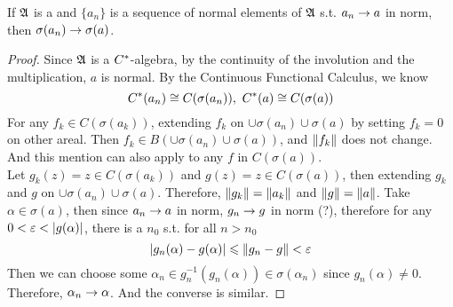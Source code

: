 \begin{lem}
	If $\mathfrak{A}$ is a \Cs and $\{a_n\}$ is a sequence of normal elements of $\mathfrak{A}$ s.t. $a_n \rightarrow a$ in norm, then $\sigma(a_n) \rightarrow \sigma(a)$.
\end{lem}
\begin{proof}
	Since $\mathfrak{A}$ is a $C^{*}$-algebra, by the continuity of the involution and the multiplication, $a$ is normal. By the Continuous Functional Calculus, we know
	\begin{equation*}
		C^{*}(a_n) \cong C(\sigma(a_n)),~ C^{*}(a) \cong C(\sigma(a))
	\end{equation*}
	For any $f_k \in C(\sigma(a_k))$, extending $f_k$ on $\cup \sigma(a_n) \cup \sigma(a)$ by setting $f_k = 0$ on other areal. Then $f_k \in B(\cup \sigma(a_n) \cup \sigma(a))$, and $\left\lVert f_k\right\lVert$ does not change. And this mention can also apply to any $f$ in $C(\sigma(a))$.\\
	Let $g_k(z) = z \in C(\sigma(a_k))$ and $g(z) = z \in C(\sigma(a))$, then extending $g_k$ and $g$ on $\cup \sigma(a_n) \cup \sigma(a)$. Therefore, $\left\lVert g_k\right\lVert = \left\lVert a_k\right\lVert$ and $\left\lVert g\right\lVert = \left\lVert a\right\lVert$. Take $\alpha \in \sigma(a)$, then since $a_n \rightarrow a$ in norm, $g_n \rightarrow g$ in norm (?), therefore for any $0 < \varepsilon < \left\lvert g(\alpha)\right\lvert$, there is a $n_0$ s.t. for all $n > n_0$
	\begin{equation*}
		\left\lvert g_n(\alpha)-g(\alpha)\right\lvert \leqslant \left\lVert g_n - g\right\lVert < \varepsilon
	\end{equation*}
	Then we can choose some $\alpha_n \in g_n^{-1}(g_n(\alpha)) \in \sigma(\alpha_n)$ since $g_n(\alpha) \neq 0$. Therefore, $\alpha_n \rightarrow \alpha$. And the converse is similar.
\end{proof}

